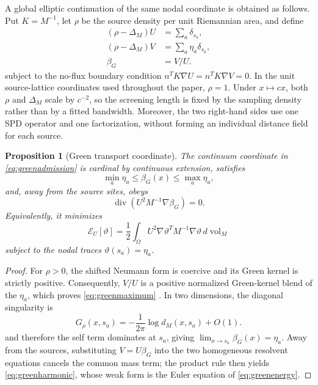 \documentclass[journal]{IEEEtran}
\newtheorem{proposition}{Proposition}
\begin{document}
A global elliptic continuation of the same nodal coordinate is obtained as
follows. Put \(K=M^{-1}\), let \(\rho\) be the source density per unit
Riemannian area, and define
\begin{equation}
 \begin{aligned}
  (\rho-\Delta_M)U&=\sum_a\delta_{s_a},\\
  (\rho-\Delta_M)V&=\sum_a\eta_a\delta_{s_a},\\
  \beta_G&=V/U.
 \end{aligned}
 \label{eq:greenadmission}
\end{equation}
subject to the no-flux boundary condition
\(n^TK\nabla U=n^TK\nabla V=0\). In the unit source-lattice coordinates used
throughout the paper, \(\rho=1\). Under \(x\mapsto cx\), both \(\rho\) and
\(\Delta_M\) scale by \(c^{-2}\), so the screening length is fixed by the
sampling density rather than by a fitted bandwidth. Moreover, the two
right-hand sides use one SPD operator and one factorization, without forming
an individual distance field for each source.

\begin{proposition}[Green transport coordinate]
The continuum coordinate in \eqref{eq:greenadmission} is cardinal by
continuous extension, satisfies
\begin{equation}
 \min_a\eta_a\leq\beta_G(x)\leq\max_a\eta_a,
 \label{eq:greenmaximum}
\end{equation}
and, away from the source sites, obeys
\begin{equation}
 \operatorname{div}\!\left(U^2M^{-1}\nabla\beta_G\right)=0.
 \label{eq:greenharmonic}
\end{equation}
Equivalently, it minimizes
\begin{equation}
 \mathcal E_U[\vartheta]
 =\frac12\int_\Omega U^2\nabla\vartheta^TM^{-1}\nabla\vartheta\,
 d\operatorname{vol}_M
 \label{eq:greenenergy}
\end{equation}
subject to the nodal traces \(\vartheta(s_a)=\eta_a\).
\end{proposition}

\begin{proof}
For \(\rho>0\), the shifted Neumann form is coercive and its Green kernel is
strictly positive. Consequently, \(V/U\) is a positive normalized
Green-kernel blend of the \(\eta_a\), which proves
\eqref{eq:greenmaximum} \cite{gilbargtrudinger2001}. In two dimensions, the
diagonal singularity is
\begin{equation}
 G_\rho(x,s_a)=-\frac{1}{2\pi}\log d_M(x,s_a)+O(1).
 \label{eq:greensingu}
\end{equation}
and therefore the self term dominates at \(s_a\), giving
\(\lim_{x\to s_a}\beta_G(x)=\eta_a\). Away from the sources, substituting
\(V=U\beta_G\) into the two homogeneous resolvent equations cancels the
common mass term; the product rule then yields \eqref{eq:greenharmonic}, whose
weak form is the Euler equation of \eqref{eq:greenenergy}.
\end{proof}
\end{document}
